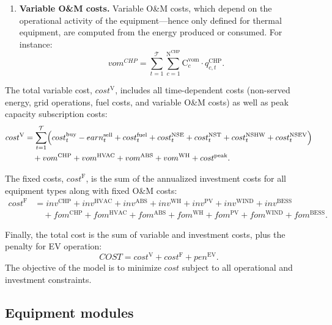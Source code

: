 \documentclass[11pt]{article}
\begin{document}
\begin{enumerate}
    Additionally, fixed O\&M costs are computed as:
    \[
    fom^\text{CHP} = \sum_{i=1}^\text{IT} \sum_{c=1}^{\text{N}^\text{CHP}} \text{CHP}^\text{fom}_{c} \cdot \frac{\text{NH}}{8760} \cdot b^\text{CHP}_{c,i},
    \]
    with similar expressions defined for all equipment types.

    \item \textbf{Variable O\&M costs.} Variable O\&M costs, which depend on the operational activity of the equipment---hence only defined for thermal equipment, are computed from the energy produced or consumed. For instance:
    \[
    {vom}^{CHP} = \sum_{t=1}^{\mathcal{T}} \sum_{c=1}^{\text{N}^\text{CHP}} \text{C}^\text{vom}_c \cdot q^\text{CHP}_{c,t}.
    \]

\end{enumerate}

The total variable cost, \(cost^\text{V}\), includes all time-dependent costs (non-served energy, grid operations, fuel costs, and variable O\&M costs) as well as peak capacity subscription costs:
\begin{align*}
cost^\text{V} &= \sum_{t=1}^{\mathcal{T}} \Bigl( cost^\text{buy}_t - earn^\text{sell}_t + cost^\text{fuel}_t + cost^\text{NSE}_t + cost^\text{NST}_t + cost^\text{NSHW}_t + cost^\text{NSEV}_t \Bigr) \\
&\quad + vom^\text{CHP} + vom^\text{HVAC} + vom^\text{ABS} + vom^\text{WH} + cost^\text{peak}.
\end{align*}

The fixed costs, \({cost}^\text{F}\), is the sum of the annualized investment costs for all equipment types along with fixed O\&M costs:
\begin{align*}
cost^\text{F} &= inv^\text{CHP} + inv^\text{HVAC} + inv^\text{ABS} + inv^\text{WH} + inv^\text{PV} + inv^\text{WIND} + inv^\text{BESS} \\ 
&\quad + fom^\text{CHP} + fom^\text{HVAC} + fom^\text{ABS} + fom^\text{WH} + fom^\text{PV} + fom^\text{WIND} + fom^\text{BESS}.
\end{align*}

Finally, the total cost is the sum of variable and investment costs, plus the penalty for EV operation:
\[
COST = cost^\text{V} + cost^\text{F} + pen^\text{EV}.
\]
The objective of the model is to minimize \(cost\) subject to all operational and investment constraints.

\subsection{Equipment modules}
\label{sec:equipment_modules}
\end{document}
